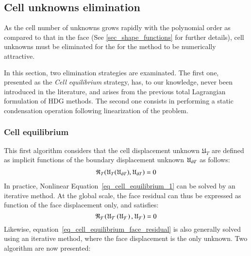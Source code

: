 \subsection{Cell unknowns elimination}
\label{sec_cell_unknowns_elimination}

As the cell number of unknowns grows rapidly with the polynomial order
as compared to that in the face (See \ref{sec_shape_functions} for further details), cell
unknowns must be eliminated for the for the method to be numerically
attractive.

In this section, two elimination strategies are examinated. The first
one, presented as the \textit{Cell equilibrium} strategy, has, to our
knowledge, never been introduced in the literature, and arises from the
previous total Lagrangian formulation of HDG methods. The second one
consists in performing a static condensation operation
\cite{abbas_hybrid_2018, abbas_hybrid_2019,di_pietro_hybrid_2015}
following linearization of the problem.

\subsubsection{Cell equilibrium}
\label{sec_cell_equilibrium_scheme}

This first algorithm considers that the cell displacement unknown
$\mathfrak{U}_{T}$ are defined as implicit functions of the boundary
displacement unknown $\mathfrak{U}_{\partial T}$ as follows:
\begin{equation}
  \label{eq_cell_equilibrium_1}
  \begin{aligned}
    \mathfrak{R}_{T}(\mathfrak{U}_{T}(\mathfrak{U}_{\partial T}),
    \mathfrak{U}_{\partial T}) = 0
  \end{aligned}
\end{equation}
In practice, Nonlinear Equation~\eqref{eq_cell_equilibrium_1} can be
solved by an iterative method.
%
%
%
At the global scale, the face residual can thus be expressed as
function of the face displacement only, and satisfies:
\begin{equation}
  \label{eq_cell_equilibrium_face_residual}
  \mathfrak{R}_{\mathcal{F}}(\mathfrak{U}_{\mathcal{T}}\left(\mathfrak{U}_{\mathcal{F}}\right),
 \mathfrak{U}_{\mathcal{F}})=0
\end{equation}
%
%
%
Likewise, equation~\eqref{eq_cell_equilibrium_face_residual} is also
generally solved using an iterative method, where the face displacement is
the only unknown. Two algorithm are now presented:

